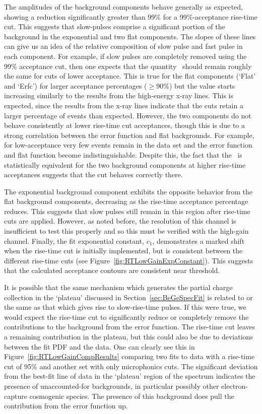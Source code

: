 The amplitudes of the background components behave generally as expected, showing a reduction significantly greater than 99\% for a 99\%-acceptance rise-time cut.  This suggests that slow-pulses comprise a significant portion of the background in the exponential and two flat components.  The slopes of these lines can give us an idea of the relative composition of slow pulse and fast pulse in each component.  For example, if slow pulses are completely removed using the 99\% acceptance cut, then one expects that the quantity \releff~should remain roughly the same for cuts of lower acceptance. This is true for the flat components (`Flat' and `Erfc') for larger acceptance percentages ($\ge90$\%) but the value starts increasing similarly to the results from the high-energy x-ray lines.  This is expected, since the results from the x-ray lines indicate that the cuts retain a larger percentage of events than expected.  However, the two components do not behave consistently at lower rise-time cut acceptances, though this is due to a strong correlation between the error function and flat backgrounds.  For example, for low-acceptance very few events remain in the data set and the error function and flat function become indistinguishable.  Despite this, the fact that the \releff~is statistically equivalent for the two background components at higher rise-time acceptances suggests that the cut behaves correctly there.  

The exponential background component exhibits the opposite behavior from the flat background components, decreasing as the rise-time acceptance percentage reduces.  This suggests that slow pulses still remain in this region after rise-time cuts are applied.  However, as noted before, the resolution of this channel is insufficient to test this properly and so this must be verified with the high-gain channel.  Finally, the fit exponential constant, $c_{1}$, demonstrates a marked shift when the rise-time cut is initially implemented, but is consistent between the different rise-time cuts (see Figure~\ref{fig:RTLowGainExpConstant}).  This suggests that the calculated acceptance contours are consistent near threshold.  

It is possible that the same mechanism which generates the partial charge collection in the `plateau' discussed in Section~\ref{sec:BeGeSpecFit} is related to or the same as that which gives rise to slow-rise-time pulses.  If this were true, we would expect the rise-time cut to significantly reduce or completely remove the contributions to the background from the error function.  The rise-time cut leaves a remaining contribution in the plateau, but this could also be due to deviations between the fit PDF and the data.  One can clearly see this in Figure~\ref{fig:RTLowGainCompResults} comparing two fits to data with a rise-time cut of 95\% and another set with only microphonics cuts.  The significant deviation from the best-fit line of data in the `plateau' region of the spectrum indicates the presence of unaccounted-for backgrounds, in particular possibly other electron-capture cosmogenic species.  The presence of this background does pull the contribution from the error function up.  


